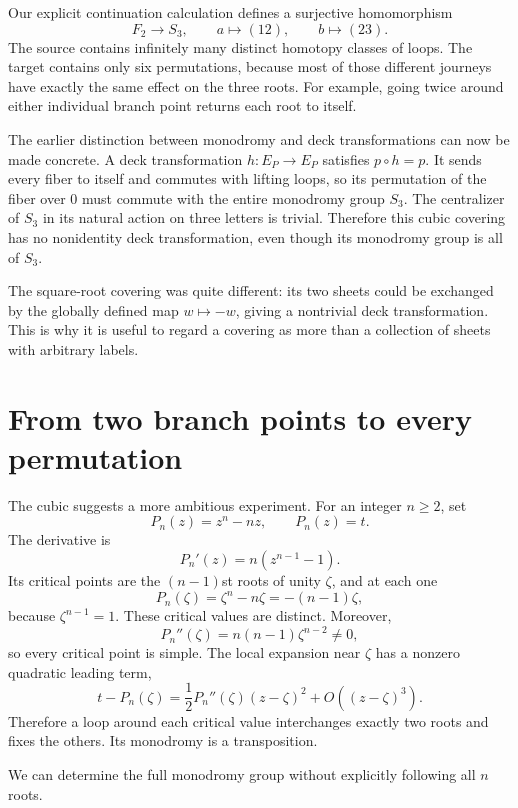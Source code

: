 Our explicit continuation calculation defines a surjective homomorphism
\[
 F_2\longrightarrow S_3,\qquad
 a\longmapsto(12),\qquad
 b\longmapsto(23).
\]
The source contains infinitely many distinct homotopy classes of loops. The target contains only six permutations, because most of those different journeys have exactly the same effect on the three roots. For example, going twice around either individual branch point returns each root to itself.

The earlier distinction between monodromy and deck transformations can now be made concrete. A deck transformation \(h:E_P\to E_P\) satisfies \(p\circ h=p\). It sends every fiber to itself and commutes with lifting loops, so its permutation of the fiber over \(0\) must commute with the entire monodromy group \(S_3\). The centralizer of \(S_3\) in its natural action on three letters is trivial. Therefore this cubic covering has no nonidentity deck transformation, even though its monodromy group is all of \(S_3\).

The square-root covering was quite different: its two sheets could be exchanged by the globally defined map \(w\mapsto-w\), giving a nontrivial deck transformation. This is why it is useful to regard a covering as more than a collection of sheets with arbitrary labels.

\section{From two branch points to every permutation}

The cubic suggests a more ambitious experiment. For an integer \(n\ge2\), set
\begin{equation}
 P_n(z)=z^n-nz,\qquad P_n(z)=t.
 \label{eq:N20261030-general-family}
\end{equation}
The derivative is
\[
 P_n'(z)=n(z^{n-1}-1).
\]
Its critical points are the \((n-1)\)st roots of unity \(\zeta\), and at each one
\[
 P_n(\zeta)=\zeta^n-n\zeta
 =-(n-1)\zeta,
\]
because \(\zeta^{n-1}=1\). These critical values are distinct. Moreover,
\[
 P_n''(\zeta)=n(n-1)\zeta^{n-2}\ne0,
\]
so every critical point is simple. The local expansion near \(\zeta\) has a nonzero quadratic leading term,
\[
 t-P_n(\zeta)
 =\frac12P_n''(\zeta)(z-\zeta)^2
  +O((z-\zeta)^3).
\]
Therefore a loop around each critical value interchanges exactly two roots and fixes the others. Its monodromy is a transposition.

We can determine the full monodromy group without explicitly following all \(n\) roots.

